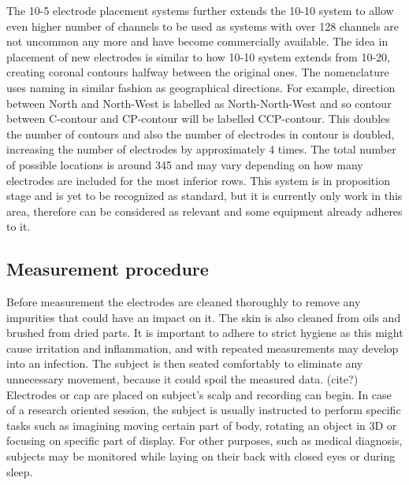 The 10-5 electrode placement systems further extends the 10-10 system to allow
even higher number of channels to be used as systems with over 128 channels are
not uncommon any more and have become commercially available. The idea in
placement of new electrodes is similar to how 10-10 system extends from 10-20,
creating coronal contours halfway between the original ones. The nomenclature
uses naming in similar fashion as geographical directions. For example,
direction between North and North-West is labelled as North-North-West and so
contour between C-contour and CP-contour will be labelled CCP-contour.
This doubles the number of contours and also the number of electrodes in contour
is doubled, increasing the number of electrodes by approximately 4 times.
The total number of possible locations is around 345 and may vary depending on
how many electrodes are included for the most inferior rows. \cite{placeSys}
This system is in proposition stage and is yet to be recognized as standard, but
it is currently only work in this area, therefore can be considered as relevant
and some equipment already adheres to it.

\subsection{Measurement procedure}
Before measurement the electrodes are cleaned thoroughly to remove any
impurities that could have an impact on it. The skin is also cleaned from oils
and brushed from dried parts. It is important to adhere to strict hygiene as
this might cause irritation and inflammation, and with repeated measurements may
develop into an infection.\cite{eegFund} The subject is then seated comfortably
to eliminate any unnecessary movement, because it could spoil the measured data.
(cite?) Electrodes or cap are placed on subject's scalp and recording can begin.
In case of a research oriented session, the subject is usually instructed to
perform specific tasks such as imagining moving certain part of body, rotating
an object in 3D or focusing on specific part of display. \cite{bcComm} For other
purposes, such as medical diagnosis, subjects may be monitored while laying on
their back with closed eyes or during sleep.


